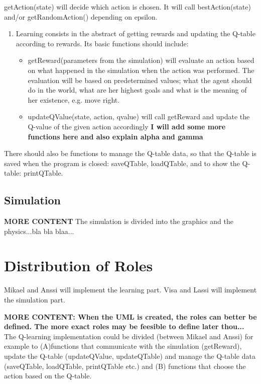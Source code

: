 \documentclass{article}
\begin{document}
getAction(state) will decide which action is chosen. It will call bestAction(state)
and/or getRandomAction() depending on epsilon.
\begin{enumerate}
\item Learning consists in the abstract of getting rewards and updating the Q-table
  according to rewards. Its basic functions should include:
   \begin{itemize}
   \item getReward(parameters from the simulation) will evaluate an action based on what
     happened in the simulation when the action was performed. The evaluation will be
     based on predetermined values; what the agent should do in the world, what are her
     highest goals and what is the meaning of her existence, e.g. move right.
   \item updateQValue(state, action, qvalue) will call getReward and update the Q-value of
     the given action accordingly
     \textbf{I will add some more functions here and also explain alpha and gamma}
    \end{itemize}
\end{enumerate}

There should also be functions to manage the Q-table data, so that the Q-table is
saved when the program is closed: saveQTable, loadQTable, and to show the Q-table:
printQTable.




\subsection{Simulation}
\textbf{MORE CONTENT}
The simulation is divided into the graphics and the physics...bla bla blaa...



\section{Distribution of Roles}
Mikael and Anssi will implement the learning part.
Visa and Lassi will implement the simulation part.

\textbf{MORE CONTENT: When the UML is created, the roles can better be defined.
  The more exact roles may be feesible to define later thou...}
The Q-learning implementation could be divided (between Mikael and Anssi) for example
to (A)functions that communicate with the simulation (getReward), update the
Q-table (updateQValue, updateQTable) and manage the Q-table data (saveQTable,
loadQTable, printQTable etc.) and (B) functions that choose the action based on the
Q-table.
\end{document}
